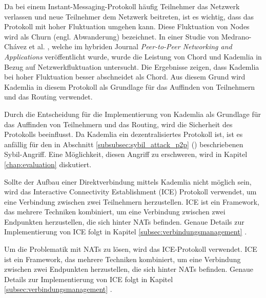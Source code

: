 \noindent Da bei einem Instant-Messaging-Protokoll häufig Teilnehmer das Netzwerk verlassen und neue Teilnehmer dem Netzwerk beitreten, ist es wichtig, dass das Protokoll mit hoher Fluktuation umgehen kann. Diese Fluktuation von Nodes wird als Churn (engl. Abwanderung) bezeichnet. In einer Studie von Medrano-Chávez et al. \parencite{MedranoChavez_ChordKademliaHighChurnScenarios}, welche im hybriden Journal \textit{Peer-to-Peer Networking and Applications} veröffentlicht wurde, wurde die Leistung von Chord und Kademlia in Bezug auf Netzwerkfluktuation untersucht. Die Ergebnisse zeigen, dass Kademlia bei hoher Fluktuation besser abschneidet als Chord. Aus diesem Grund wird Kademlia in diesem Protokoll als Grundlage für das Auffinden von Teilnehmern und das Routing verwendet.


Durch die Entscheidung für die Implementierung von Kademlia als Grundlage für das Auffinden von Teilnehmern und das Routing, wird die Sicherheit des Protokolls beeinflusst. Da Kademlia ein dezentralisiertes Protokoll ist, ist es anfällig für den in Abschnitt \ref{subsubsec:sybil_attack_p2p} (\textit{}) beschriebenen Sybil-Angriff. Eine Möglichkeit, diesen Angriff zu erschweren, wird in Kapitel \ref{chap:evaluation} \textit{} diskutiert.

Sollte der Aufbau einer Direktverbindung mittels Kademlia nicht möglich sein, wird das Interactive Connectivity Establishment (ICE) Protokoll verwendet, um eine Verbindung zwischen zwei Teilnehmern herzustellen. ICE ist ein Framework, das mehrere Techniken kombiniert, um eine Verbindung zwischen zwei Endpunkten herzustellen, die sich hinter NATs befinden. Genaue Details zur Implementierung von ICE folgt in Kapitel \ref{subsec:verbindungsmanagement} \textit{}.

Um die Problematik mit NATs zu lösen, wird das ICE-Protokoll verwendet. ICE ist ein Framework, das mehrere Techniken kombiniert, um eine Verbindung zwischen zwei Endpunkten herzustellen, die sich hinter NATs befinden. Genaue Details zur Implementierung von ICE folgt in Kapitel \ref{subsec:verbindungsmanagement} \textit{}.


